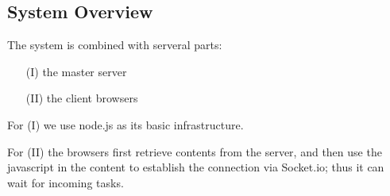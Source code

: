 \subsection{System Overview}

The system is combined with serveral parts:

\begin{enumerate}

\item[(I)] the master server

\item[(II)] the client browsers

\end{enumerate}

For (I) we use node.js as its basic infrastructure.

For (II) the browsers first retrieve contents from the server, and then use the javascript in the content to establish the connection via Socket.io; thus it can wait for incoming tasks.

